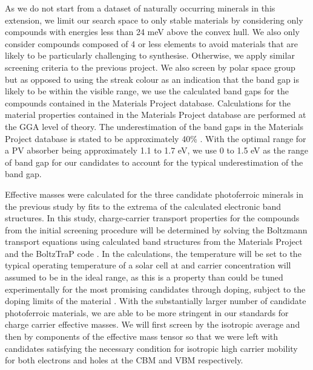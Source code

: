 \documentclass[11pt, twoside]{report}
\begin{document}
As we do not start from a dataset of naturally occurring minerals in this extension, we limit our search space to only stable materials by considering only compounds with energies less than 24 meV above the convex hull. We also only consider compounds composed of 4 or less elements to avoid materials that are likely to be particularly challenging to synthesise. 
Otherwise, we apply similar screening criteria to the previous project. We also screen by polar space group but as opposed to using the streak colour as an indication that the band gap is likely to be within the visible range, we use the calculated band gaps for the compounds contained in the Materials Project database. Calculations for the material properties contained in the Materials Project database are performed at the GGA level of theory.
The underestimation of the band gaps in the Materials Project database is stated to be approximately 40\% \cite{MP_bandgaps, MP_highthroughput}. With the optimal range for a PV absorber being approximately 1.1 to 1.7 eV, we use 0 to 1.5 eV as the range of band gap for our candidates to account for the typical underestimation of the band gap. 

Effective masses were calculated for the three candidate photoferroic minerals in the previous study by fits to the extrema of the calculated electronic band structures. In this study, charge-carrier transport properties for the compounds from the initial screening procedure will be determined by solving the Boltzmann transport equations using calculated band structures from the Materials Project and the BoltzTraP code \cite{Boltztrap}. In the calculations, the temperature will be set to the typical operating temperature of a solar cell at and carrier concentration will assumed to be in the ideal range, as this is a property than could be tuned experimentally for the most promising candidates through doping, subject to the doping limits of the material \cite{Zhang_doping_limits}. 
With the substantially larger number of candidate photoferroic materials, we are able to be more stringent in our standards for charge carrier effective masses. We will first screen by the isotropic average and then by components of the effective mass tensor so that we were left with candidates satisfying the necessary condition for isotropic high carrier mobility for both electrons and holes at the CBM and VBM respectively.

\end{document}
